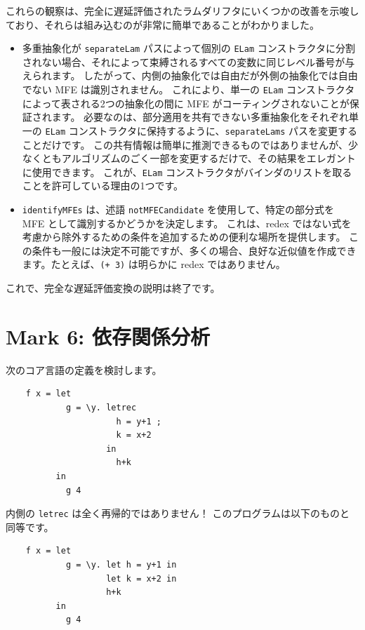 \documentclass{jbook}
\begin{document}
これらの観察は、完全に遅延評価されたラムダリフタにいくつかの改善を示唆しており、それらは組み込むのが非常に簡単であることがわかりました。

\begin{itemize}
	\item 多重抽象化が \texttt{separateLam} パスによって個別の \texttt{ELam} コンストラクタに分割されない場合、それによって束縛されるすべての変数に同じレベル番号が与えられます。
	      したがって、内側の抽象化では自由だが外側の抽象化では自由でない MFE は識別されません。
	      これにより、単一の \texttt{ELam} コンストラクタによって表される2つの抽象化の間に MFE がコーティングされないことが保証されます。
	      必要なのは、部分適用を共有できない多重抽象化をそれぞれ単一の \texttt{ELam} コンストラクタに保持するように、\texttt{separateLams} パスを変更することだけです。
	      この共有情報は簡単に推測できるものではありませんが、少なくともアルゴリズムのごく一部を変更するだけで、その結果をエレガントに使用できます。
	      これが、\texttt{ELam} コンストラクタがバインダのリストを取ることを許可している理由の1つです。
	\item \texttt{identifyMFEs} は、述語 \texttt{notMFECandidate} を使用して、特定の部分式を MFE として識別するかどうかを決定します。
	      これは、redex ではない式を考慮から除外するための条件を追加するための便利な場所を提供します。
	      この条件も一般には決定不可能ですが、多くの場合、良好な近似値を作成できます。たとえば、\texttt{(+ 3)} は明らかに redex ではありません。
\end{itemize}

これで、完全な遅延評価変換の説明は終了です。
\newpage

\section{Mark 6: 依存関係分析 \dag}

次のコア言語の定義を検討します。

\begin{verbatim}
	f x = let
	        g = \y. letrec
	                  h = y+1 ;
	                  k = x+2
	                in
	                  h+k
	      in
	        g 4
\end{verbatim}

内側の \texttt{letrec} は全く再帰的ではありません！
このプログラムは以下のものと同等です。

\begin{verbatim}
	f x = let
	        g = \y. let h = y+1 in
	                let k = x+2 in
	                h+k
	      in
	        g 4
\end{verbatim}
\end{document}
